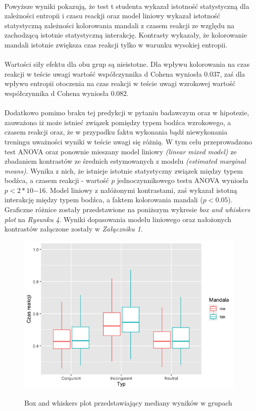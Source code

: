 \documentclass[12pt,a4paper,final,oneside,onecolumn,titlepage]{article}
\begin{document}
\paragraph{}
Powyższe wyniki pokazują, że test t studenta wykazał istotność statystyczną dla zależności entropii i czasu reackji oraz model liniowy wykazał istotność statystyczną zależności kolorowania mandali z czasem reakcji ze względu na zachodzącą istotnie statystyczną interakcję. Kontrasty wykazały, że kolorowanie mandali istotnie zwiększa czas reakcji tylko w warunku wysokiej entropii.
\paragraph{}
Wartości siły efektu dla obu grup są nieistotne. Dla wpływu kolorowania na czas reakcji w teście uwagi wartość współczynnika d Cohena wyniosła $0.037$, zaś dla wpływu entropii otoczenia na czas reakcji w teście uwagi wzrokowej wartość współczynnika d Cohena wyniosła $0.082$.
\paragraph{}
Dodatkowo pomimo braku tej predykcji w pytaniu badawczym oraz w hipotezie, zauważono iż może istnieć związek pomiędzy typem bodźca wzrokowego, a czasem reakcji oraz, że w przypadku faktu wykonania bądź niewykonania treningu uważności wyniki w teście uwagi się różnią. W tym celu przeprowadzono test ANOVA oraz ponownie mieszany model liniowy \textit{(linear mixed model)} ze zbadaniem kontrastów ze średnich estymowanych z modelu \textit{(estimated marginal means)}. Wynika z nich, że istnieje istotnie statystyczny związek między typem bodźca, a czasem reakcji - wartość $p$ jednoczynnikowego testu ANOVA wyniosła $p<2*10{-16}$. Model liniowy z nałóżonymi kontrastami, zaś wykazał istotną interakcję między typem bodźca, a faktem kolorowania mandali ($p<0.05$). Graficzne różnice zostały przedstawione na poniższym wykresie \textit{box and whiskers plot} na \textit{Rysunku 4}. Wyniki dopasowania modelu liniowego oraz nałożonych kontrastów załączone zostały w \textit{Załączniku 1}.
\begin{figure}[H]
\centering
\caption{Box and whiskers plot przedstawiający mediany wyników w grupach}
\includegraphics[scale=0.5]{box2}
\label{Rysunek}
\end{figure}
\end{document}
